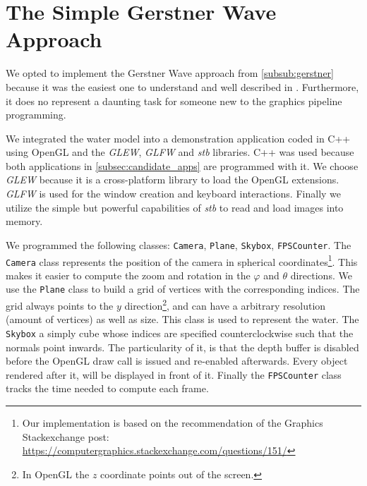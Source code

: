 \section{The Simple Gerstner Wave Approach}\label{sec:simple_gerstner_waves}


We opted to implement the Gerstner Wave approach from \cref{subsub:gerstner}
because it was the easiest one to understand and well described in
\autocite{fernando2004gpu}. Furthermore, it does no represent a daunting task
for someone new to the graphics pipeline programming.

We integrated the water model into a demonstration application coded in C++
using OpenGL and the \textit{GLEW}, \textit{GLFW} and \textit{stb} libraries.
C++ was used because both applications in \autoref{subsec:candidate_apps} are
programmed with it. We choose \textit{GLEW} because it is a cross-platform
library to load the OpenGL extensions. \textit{GLFW} is used for the window
creation and keyboard interactions. Finally we utilize the simple but powerful
capabilities of \textit{stb} to read and load images into memory.

We programmed the following classes: \texttt{Camera}, \texttt{Plane},
\texttt{Skybox}, \texttt{FPSCounter}. The \texttt{Camera} class represents the
position of the camera in spherical coordinates\footnote{Our implementation is
    based on the recommendation of the Graphics Stackexchange post:
\url{https://computergraphics.stackexchange.com/questions/151/}}. This makes it
easier to compute the zoom and rotation in the $\varphi$ and $\theta$
directions. We use the \texttt{Plane} class to build a grid of vertices with
the corresponding indices. The grid always points to the $y$
direction\footnote{In OpenGL the $z$ coordinate points out of the screen.}, and
can have a arbitrary resolution (amount of vertices) as well as size. This class
is used to represent the water. The \texttt{Skybox} a simply cube whose indices
are specified counterclockwise such that the normals point inwards. The
particularity of it, is that the depth buffer is disabled before the OpenGL draw
call is issued and re-enabled afterwards. Every object rendered after it, will
be displayed in front of it. Finally the \texttt{FPSCounter} class tracks the
time needed to compute each frame.

